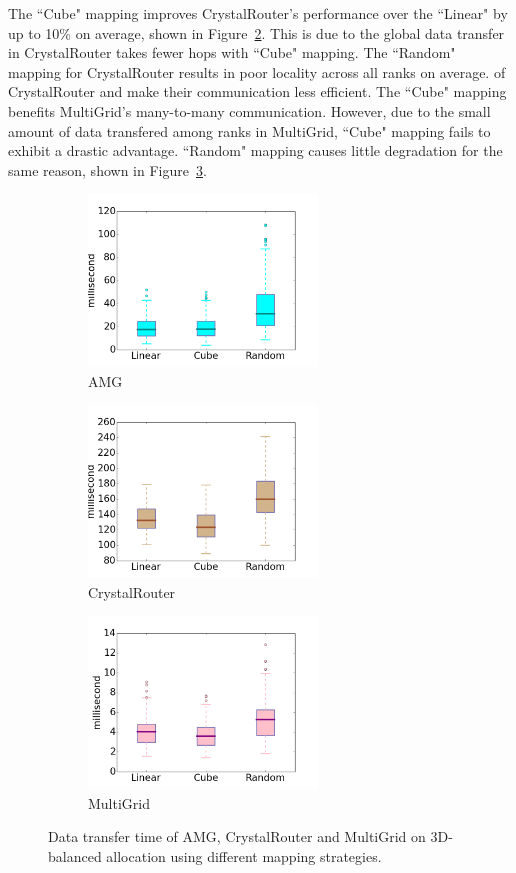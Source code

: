 The ``Cube" mapping improves CrystalRouter's performance over the ``Linear" 
by up to 10\% on average, shown in Figure~\ref{fig:diffmap-cr}. 
This is due to the global data transfer in CrystalRouter takes fewer hops with ``Cube" mapping. 
The ``Random" mapping for CrystalRouter results in poor locality across all ranks on average. 
of CrystalRouter and make their communication less efficient. 
The ``Cube" mapping benefits MultiGrid's many-to-many communication. 
However, due to the small amount of data transfered among ranks in MultiGrid, 
``Cube" mapping fails to exhibit a drastic advantage. 
``Random" mapping causes little degradation for the same reason, 
shown in Figure~\ref{fig:diffmap-mg}.


\begin{figure}[t]
    \centering
    \begin{subfigure}[t]{0.32\textwidth}
        \centering
        \includegraphics[height=1.8in]{figs/diffmapping/amg}
        \caption{AMG}
        \label{fig:diffmap-amg}
    \end{subfigure}%
    \hspace{1em}%
    \begin{subfigure}[t]{0.32\textwidth}
        \centering
        \includegraphics[height=1.8in]{figs/diffmapping/cr}
        \caption{CrystalRouter}
        \label{fig:diffmap-cr}
    \end{subfigure}%
    \begin{subfigure}[t]{0.32\textwidth}
        \centering
        \includegraphics[height=1.8in]{figs/diffmapping/mg}
        \caption{MultiGrid}
        \label{fig:diffmap-mg}
    \end{subfigure}%
   \caption{
   Data transfer time of AMG, CrystalRouter and MultiGrid 
   on 3D-balanced allocation using  different mapping strategies.
   }
   \label{fig:diffmap}
\end{figure}
